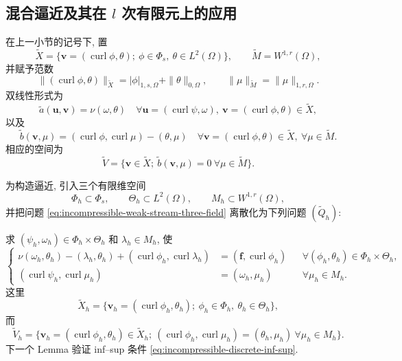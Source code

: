 \subsection{混合逼近及其在 $l$ 次有限元上的应用}
\label{subsec:incompressible-sfvp-mixed-approximation}

在上一小节的记号下, 置
\[
\widetilde X
=\{\mathbf v=(\operatorname{curl}\phi,\theta);
\ \phi\in\Phi_s,\ \theta\in L^2(\Omega)\},
\qquad
\widetilde M=W^{1,r}(\Omega),
\]
并赋予范数
\[
\| (\operatorname{curl}\phi,\theta)\|_{\widetilde X}
=|\phi|_{1,s,\Omega}+\|\theta\|_{0,\Omega},
\qquad
\|\mu\|_{\widetilde M}=\|\mu\|_{1,r,\Omega}.
\]
双线性形式为
\[
\widetilde a(\mathbf u,\mathbf v)=\nu(\omega,\theta)
\quad
\forall\mathbf u=(\operatorname{curl}\psi,\omega),
\ \mathbf v=(\operatorname{curl}\phi,\theta)\in\widetilde X,
\]
以及
\[
\widetilde b(\mathbf v,\mu)
=(\operatorname{curl}\phi,\operatorname{curl}\mu)-(\theta,\mu)
\quad
\forall\mathbf v=(\operatorname{curl}\phi,\theta)\in\widetilde X,
\ \forall\mu\in\widetilde M.
\]
相应的空间为
\[
\widetilde V
=\{\mathbf v\in\widetilde X;
\ \widetilde b(\mathbf v,\mu)=0
\ \forall\mu\in\widetilde M\}.
\]

为构造逼近, 引入三个有限维空间
\begin{equation}\label{eq:incompressible-sfvp-discrete-spaces}
\Phi_h\subset\Phi_s,
\qquad
\Theta_h\subset L^2(\Omega),
\qquad
M_h\subset W^{1,r}(\Omega),
\end{equation}
并把问题 \eqref{eq:incompressible-weak-stream-three-field}
离散化为下列问题 $(\widetilde Q_h)$:

求 $(\psi_h,\omega_h)\in\Phi_h\times\Theta_h$
和 $\lambda_h\in M_h$, 使
\begin{equation}\label{eq:incompressible-sfvp-discrete-four-field}
\left\{
\begin{aligned}
\nu(\omega_h,\theta_h)-(\lambda_h,\theta_h)
+(\operatorname{curl}\phi_h,\operatorname{curl}\lambda_h)
&=(\mathbf f,\operatorname{curl}\phi_h)
&&\forall(\phi_h,\theta_h)\in\Phi_h\times\Theta_h,\\
(\operatorname{curl}\psi_h,\operatorname{curl}\mu_h)
&=(\omega_h,\mu_h)
&&\forall\mu_h\in M_h.
\end{aligned}
\right.
\end{equation}
这里
\[
\widetilde X_h
=\{\mathbf v_h=(\operatorname{curl}\phi_h,\theta_h);
\ \phi_h\in\Phi_h,\ \theta_h\in\Theta_h\},
\]
而
\[
\widetilde V_h
=\{\mathbf v_h=(\operatorname{curl}\phi_h,\theta_h)
\in\widetilde X_h;
\ (\operatorname{curl}\phi_h,\operatorname{curl}\mu_h)
=(\theta_h,\mu_h)\ \forall\mu_h\in M_h\}.
\]
下一个 Lemma 验证 inf--sup 条件
\eqref{eq:incompressible-discrete-inf-sup}.

